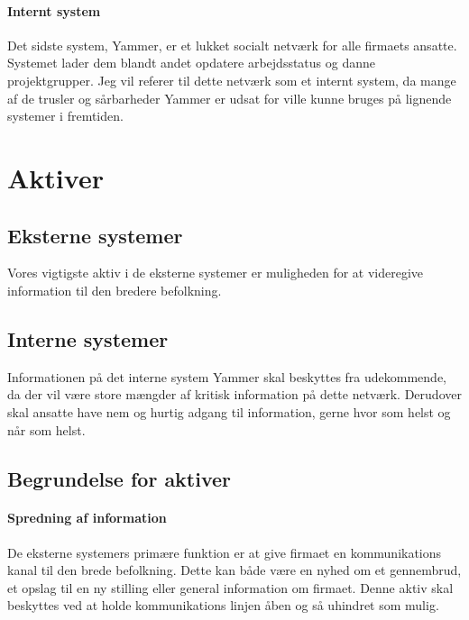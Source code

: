 \documentclass{article}
\begin{document}
\paragraph{Internt system}
Det sidste system, Yammer, er et lukket socialt netværk for alle firmaets ansatte. Systemet lader dem blandt andet opdatere arbejdsstatus og danne projektgrupper. Jeg vil referer til dette netværk som et internt system, da mange af de trusler og sårbarheder Yammer er udsat for ville kunne bruges på lignende systemer i fremtiden.





\section{Aktiver}
\subsection{Eksterne systemer}
Vores vigtigste aktiv i de eksterne systemer er muligheden for at videregive information til den bredere befolkning. 

\subsection{Interne systemer}
Informationen på det interne system Yammer skal beskyttes fra udekommende, da der vil være store mængder af kritisk information på dette netværk. Derudover skal ansatte have nem og hurtig adgang til information, gerne hvor som helst og når som helst.

\subsection{Begrundelse for aktiver}

\paragraph{Spredning af information}
De eksterne systemers primære funktion er at give firmaet en kommunikations kanal til den brede befolkning. Dette kan både være en nyhed om et gennembrud, et opslag til en ny stilling eller general information om firmaet. Denne aktiv skal beskyttes ved at holde kommunikations linjen åben og så uhindret som mulig.
\end{document}

